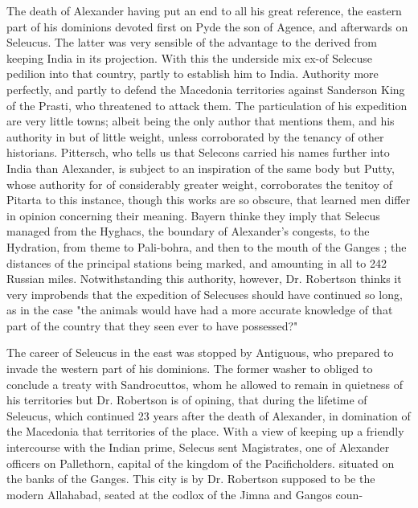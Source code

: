 \documentclass{article}
\begin{document}
The death of Alexander having put an end to all his great reference, the eastern part of his dominions devoted first on Pyde the son of Agence, and afterwards on Seleucus. The latter was very sensible of the advantage to the derived from keeping India in its projection. With this the underside mix ex-of Selecuse pedilion into that country, partly to establish him to India. Authority more perfectly, and partly to defend the Macedonia territories against Sanderson King of the Prasti, who threatened to attack them. The particulation of his expedition are very little towns; albeit being the only author that mentions them, and his authority in but of little weight, unless corroborated by the tenancy of other historians. Pittersch, who tells us that Selecons carried his names further into India than Alexander, is subject to an inspiration of the same body but Putty, whose authority for of considerably greater weight, corroborates the tenitoy of Pitarta to this instance, though this works are so obscure, that learned men differ in opinion concerning their meaning. Bayern thinke they imply that Selecus managed from the Hyghacs, the boundary of Alexander’s congests, to the Hydration, from theme to Pali-bohra, and then to the mouth of the Ganges ; the distances of the principal stations being marked, and amounting in all to 242 Russian miles. Notwithstanding this authority, however, Dr. Robertson thinks it very improbends that the expedition of Selecuses should have continued so long, as in the case "the animals would have had a more accurate knowledge of that part of the country that they seen ever to have possessed?"

The career of Seleucus in the east was stopped by Antiguous, who prepared to invade the western part of his dominions. The former washer to obliged to conclude a treaty with Sandrocuttos, whom he allowed to remain in quietness of his territories but Dr. Robertson is of opining, that during the lifetime of Seleucus, which continued 23 years after the death of Alexander, in domination of the Macedonia that territories of the place. With a view of keeping up a friendly intercourse with the Indian prime, Selecus sent Magistrates, one of Alexander officers on Pallethorn, capital of the kingdom of the Pacificholders. situated on the banks of the Ganges. This city is by Dr. Robertson supposed to be the modern Allahabad, seated at the codlox of the Jimna and Gangos coun-
\end{document}
